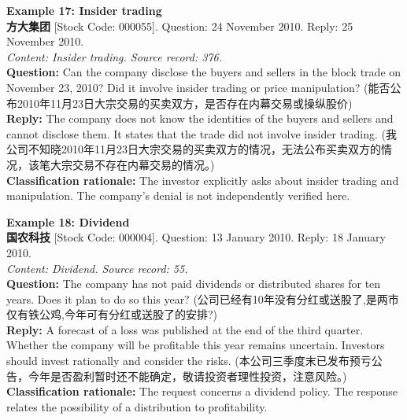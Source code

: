 \vspace{0.4cm}
\noindent \textbf{Example 17: Insider trading} \\
\textbf{方大集团} [Stock Code: 000055]. Question: 24 November 2010. Reply: 25 November 2010. \\
\textit{Content: Insider trading. Source record: 376.} \\
\textbf{Question:} Can the company disclose the buyers and sellers in the block trade on November 23, 2010? Did it involve insider trading or price manipulation? (能否公布2010年11月23日大宗交易的买卖双方，是否存在内幕交易或操纵股价) \\
\textbf{Reply:} The company does not know the identities of the buyers and sellers and cannot disclose them. It states that the trade did not involve insider trading. (我公司不知晓2010年11月23日大宗交易的买卖双方的情况，无法公布买卖双方的情况，该笔大宗交易不存在内幕交易的情况。) \\
\textbf{Classification rationale:} The investor explicitly asks about insider trading and manipulation. The company's denial is not independently verified here.

\clearpage
\noindent \textbf{Example 18: Dividend} \\
\textbf{国农科技} [Stock Code: 000004]. Question: 13 January 2010. Reply: 18 January 2010. \\
\textit{Content: Dividend. Source record: 55.} \\
\textbf{Question:} The company has not paid dividends or distributed shares for ten years. Does it plan to do so this year? (公司已经有10年没有分红或送股了,是两市仅有铁公鸡,今年可有分红或送股了的安排?) \\
\textbf{Reply:} A forecast of a loss was published at the end of the third quarter. Whether the company will be profitable this year remains uncertain. Investors should invest rationally and consider the risks. (本公司三季度末已发布预亏公告，今年是否盈利暂时还不能确定，敬请投资者理性投资，注意风险。) \\
\textbf{Classification rationale:} The request concerns a dividend policy. The response relates the possibility of a distribution to profitability.


